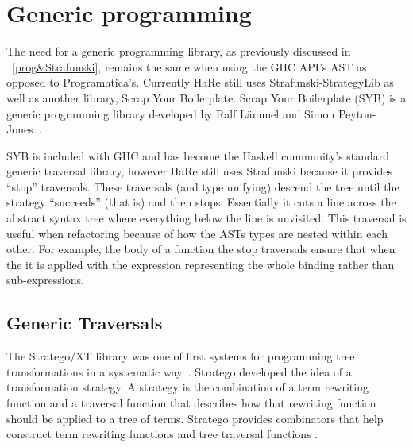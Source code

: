 \DIFaddend \section{Generic programming}
\label{genProg}

The need for a generic programming library, as previously discussed in \DIFdelbegin {}\DIFdelend \DIFaddbegin {}\DIFaddend ~\ref{prog&Strafunski}, remains the same when using the GHC API's AST as opposed to Programatica's. Currently HaRe still uses Strafunski-StrategyLib as well as another library, Scrap Your Boilerplate. Scrap Your Boilerplate (SYB) is a generic programming library developed by Ralf L{\"a}mmel and Simon Peyton-Jones~\citep{syb}. 

SYB is included with GHC and has become the Haskell community's standard generic traversal library, however HaRe still uses Strafunski because it provides ``stop'' traversals. These traversals (\DIFdelbegin {}\DIFdelend \DIFaddbegin {}\DIFaddend and type unifying) descend the tree until the strategy ``succeeds'' (that is\DIFdelbegin {}\DIFdelend \DIFaddbegin {}\DIFaddend ) and then stops. Essentially it cuts a line across the abstract syntax tree where everything below the line is unvisited. This traversal is useful when refactoring because of how the ASTs types are nested within each other. For example, \DIFdelbegin {}\DIFdelend \DIFaddbegin {}\DIFaddend the body of a function \DIFdelbegin {}\DIFdelend the stop traversals ensure that when the \DIFdelbegin {}\DIFdelend \DIFaddbegin {}\DIFaddend it is applied with the expression representing the whole binding rather than sub-expressions.

\subsection{Generic Traversals}
The Stratego/XT library was one of first systems for programming tree transformations in a systematic way~\citep{stratego}. Stratego developed the idea of a transformation strategy. A strategy is the combination of a term rewriting function and a traversal function that describes how that rewriting function should be applied to a tree of terms. Stratego provides combinators that help construct term rewriting functions and tree traversal functions \citep{stratego}.

